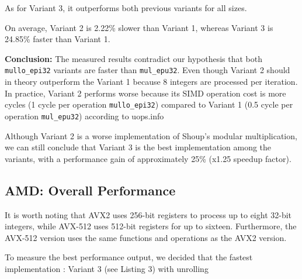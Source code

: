 \documentclass{article}
\newcommand{\pointlabel}[1]{\par\smallskip\noindent\textbf{\textcolor{accentorange}{#1:}} }
\begin{document}
As for Variant 3, it outperforms both previous variants for all sizes.

On average, Variant 2 is 2.22\% slower than Variant 1, whereas Variant 3 is 24.85\% faster than Variant 1.

\pointlabel{Conclusion}The measured results contradict our hypothesis that both \texttt{mullo\_epi32} variants are faster than \texttt{mul\_epu32}. Even though Variant 2 should in theory outperform the Variant 1 because 8 integers are processed per iteration. In practice, Variant 2 performs worse because its SIMD operation cost is more cycles (1 cycle per operation \texttt{mullo\_epi32}) compared to Variant 1 (0.5 cycle per operation \texttt{mul\_epu32}) according to uops.info \cite{uopsInfoTable}

Although Variant 2 is a worse implementation of Shoup's modular multiplication, we can still conclude that Variant 3 is the best implementation among the variants, with a performance gain of approximately 25\% (x1.25 speedup factor).

\subsection{AMD: Overall Performance}
It is worth noting that AVX2 uses 256-bit registers to process up to eight 32-bit integers, while AVX-512 uses 512-bit registers for up to sixteen. Furthermore, the AVX-512 version uses the same functions and operations as the AVX2 version.

To measure the best performance output, we decided that the fastest implementation : Variant 3 (see Listing 3) with unrolling
\end{document}
